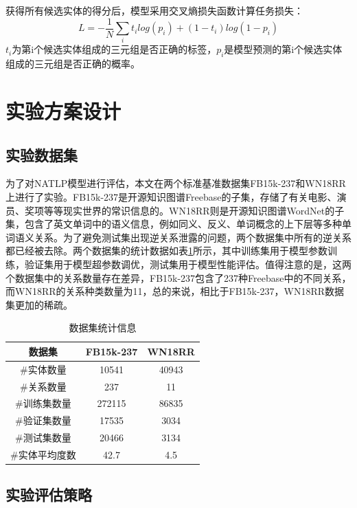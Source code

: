 获得所有候选实体的得分后，模型采用交叉熵损失函数计算任务损失：
\begin{equation}
  L = -\frac{1}{N}\sum\limits_{i}t_ilog(p_i)+(1-t_i)log(1-p_i)
\end{equation}
$t_i$为第i个候选实体组成的三元组是否正确的标签，$p_i$是模型预测的第i个候选实体组成的三元组是否正确的概率。

\section{实验方案设计}

\subsection{实验数据集}
为了对NATLP模型进行评估，本文在两个标准基准数据集FB15k-237和WN18RR上进行了实验。FB15k-237是开源知识图谱Freebase的子集，存储了有关电影、演员、奖项等等现实世界的常识信息的。WN18RR则是开源知识图谱WordNet的子集，包含了英文单词中的语义信息，例如同义、反义、单词概念的上下层等多种单词语义关系。为了避免测试集出现逆关系泄露的问题，两个数据集中所有的逆关系都已经被去除。两个数据集的统计数据如表\ref{dataset_statistics}所示，其中训练集用于模型参数训练，验证集用于模型超参数调优，测试集用于模型性能评估。值得注意的是，这两个数据集中的关系数量存在差异，FB15k-237包含了237种Freebase中的不同关系，而WN18RR的关系种类数量为11，总的来说，相比于FB15k-237，WN18RR数据集更加的稀疏。

\begin{table}[htbp]
  \renewcommand\arraystretch{1.5}
  \caption{数据集统计信息}
  \centering
  \begin{tabular}{*{3}{c}}
    \toprule
    数据集 & FB15k-237 & WN18RR\\
    \midrule
    \#实体数量  & 10541 & 40943 \\
    \#关系数量 & 237 & 11\\
    \#训练集数量 & 272115 &86835\\
    \#验证集数量 &17535 &3034\\
    \#测试集数量 &20466 &3134\\
    \#实体平均度数 &42.7 &4.5\\
    \bottomrule
  \end{tabular}
  \label{dataset_statistics}
\end{table}

\subsection{实验评估策略}

